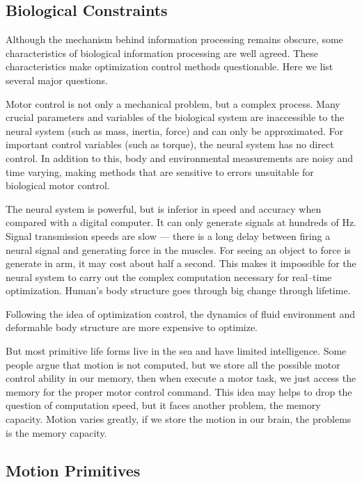\subsection{Biological Constraints}
Although the mechanism behind information processing remains obscure, some characteristics of biological information processing are well agreed.
These characteristics make optimization control methods questionable. 
Here we list several major questions\citep{Glynn2003}.  
\begin{itemize}
Motor control is not only a mechanical problem, but a complex process. 
Many crucial parameters and variables of the biological system are inaccessible to the neural system (such as mass, inertia, force) and can only be approximated. 
For important control variables (such as torque), the neural system has no direct control.
In addition to this, body and environmental measurements are noisy and time varying, making methods that are sensitive to errors unsuitable for biological motor control.

The neural system is powerful, but is inferior in speed and accuracy when compared with a digital computer. It can only generate signals at hundreds of Hz.
Signal transmission speeds are slow — there is a long delay between firing a neural signal and generating force in the muscles.
For seeing an object to force is generate in arm, it may cost about half a second. 
This makes it impossible for the neural system to carry out the complex computation necessary for real–time optimization.
Human’s body structure goes through big change through lifetime.

Following the idea of optimization control, the dynamics of fluid environment and deformable body structure are more expensive to optimize. 

But most primitive life forms live in the sea and have limited intelligence. 
Some people argue that motion is not computed, but we store all the possible motor control ability in our memory, then when execute a motor task, we just access the memory for the proper motor control command.
This idea may helps to drop the question of computation speed, but it faces another problem, the memory capacity. 
Motion varies greatly, if we store the motion in our brain, the problems is the memory capacity.
\end{itemize}

\subsection{Motion Primitives}


